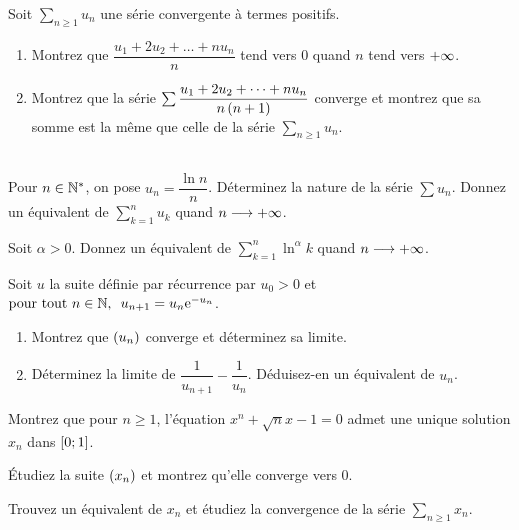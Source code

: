 \begin{exosss}[Exercice 22]
Soit \(\sum_{n\geq1}u_n\) une série convergente à termes positifs.

\begin{enumerate}
    \item Montrez que \(\dfrac{u_1+2u_2+\dots+nu_n}{n}\) tend vers \(0\) quand \(n\) tend vers \(+\infty\). \\
    \item Montrez que la série \(\sum\dfrac{u_1+2u_2+\dots+nu_n}{n\left(n+1\right)}\) converge et montrez que sa somme est la même que celle de la série \(\sum_{n\geq1}u_n\).
\end{enumerate}
\end{exosss}



\begin{exo}~\\
Pour \(n\in\mathbb{N}^*\), on pose \(u_n=\dfrac{\ln n}{n}\). Déterminez la nature de la série \(\sum u_n\). Donnez un équivalent de \(\sum_{k=1}^nu_k\) quand \(n\longrightarrow+\infty\).
\end{exo}



\begin{exo}
Soit \(\alpha>0\). Donnez un équivalent de \(\sum_{k=1}^n\ln^\alpha k\) quand \(n\longrightarrow+\infty\).
\end{exo}



\begin{exo}
Soit \(u\) la suite définie par récurrence par \(u_0>0\) et \(\quantifs{\tpt n\in\N}u_{n+1}=u_n\e{-u_n}\).

\begin{enumerate}
    \item Montrez que \(\left(u_n\right)\) converge et déterminez sa limite. \\
    \item Déterminez la limite de \(\dfrac{1}{u_{n+1}}-\dfrac{1}{u_n}\). Déduisez-en un équivalent de \(u_n\).
\end{enumerate}
\end{exo}



\begin{exo}
Montrez que pour \(n\geq1\), l'équation \(x^n+\sqrt{n}x-1=0\) admet une unique solution \(x_n\) dans \(\left[0;1\right]\).

Étudiez la suite \(\left(x_n\right)\) et montrez qu'elle converge vers \(0\).

Trouvez un équivalent de \(x_n\) et étudiez la convergence de la série \(\sum_{n\geq1}x_n\).
\end{exo}



